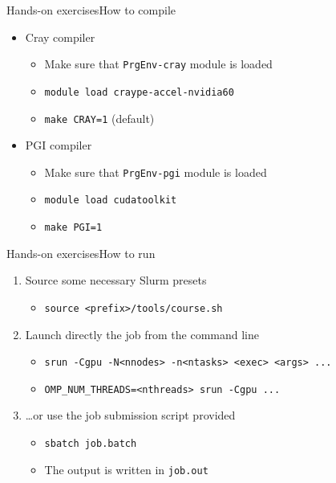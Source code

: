 \documentclass[aspectratio=169,12pt]{beamer}
\newcommand\shinline[2][]{\lstinline[style=shstyle,basicstyle=\ttfamily,#1]!#2!}
\begin{document}
\begin{frame}[fragile]{Hands-on exercises}{How to compile}
  \begin{itemize}
  \item Cray compiler
    \begin{itemize}
    \item Make sure that \shinline{PrgEnv-cray} module is loaded
    \item \shinline{module load craype-accel-nvidia60}
    \item \shinline{make CRAY=1} (default)
    \end{itemize}
  \item PGI compiler
    \begin{itemize}
    \item Make sure that \shinline{PrgEnv-pgi} module is loaded
    \item \shinline{module load cudatoolkit}
    \item \shinline{make PGI=1}
    \end{itemize}
  \end{itemize}
\end{frame}

\begin{frame}[fragile]{Hands-on exercises}{How to run}
  \begin{enumerate}
  \item Source some necessary Slurm presets
    \begin{itemize}
    \item \texttt{source <prefix>/tools/course.sh}
    \end{itemize}
  \item Launch directly the job from the command line
    \begin{itemize}
    \item \texttt{srun -Cgpu -N<nnodes> -n<ntasks> <exec> <args> ...}
    \item \texttt{OMP\_NUM\_THREADS=<nthreads> srun -Cgpu ...}
    \end{itemize}
  \item \dots or use the job submission script provided
    \begin{itemize}
    \item \shinline{sbatch job.batch}
    \item The output is written in \shinline{job.out}
    \end{itemize}
  \end{enumerate}
\end{frame}
\end{document}
